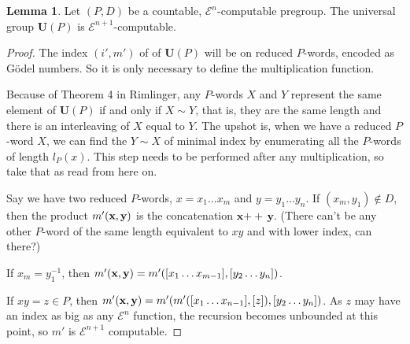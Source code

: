 \documentclass[a4paper]{article}
\newcommand{\grz}[1]{$\mathcal{E}^{#1}$}	%
\newcommand{\xvec}{\mathbf{x}}	%
\newcommand{\yvec}{\mathbf{y}}	%
\newcommand{\concat}{\ensuremath{+\!\!\!\!+\,}}	%
\newcommand{\ugroup}{\mathbf{U}(P)}														%
\theoremstyle{plain}
\theoremstyle{definition}
\newtheorem{lemma}[theorem]{Lemma}
\begin{document}
\begin{lemma} Let $(P,D)$ be a countable, \grz{n}-computable pregroup. The universal group $\ugroup$ is \grz{n+1}-computable.
\end{lemma}

\begin{proof}
The index $(i',m')$ of of $\ugroup$ will be on reduced $P$-words, encoded as G\"odel numbers. So it is only necessary to define the multiplication function.

Because of Theorem 4 in Rimlinger, any $P$-words $X$ and $Y$ represent the same element of $\ugroup$ if and only if $X \sim Y$, that is, they are the same length and there is an interleaving of $X$ equal to $Y$. The upshot is, when we have a reduced $P$-word $X$, we can find the $Y \sim X$ of minimal index by enumerating all the $P$-words of length $l_P(x)$. This step needs to be performed after any multiplication, so take that as read from here on.

Say we have two reduced $P$-words, $x = x_1 \dots x_m$ and $y = y_1 \dots y_n$. If $(x_m,y_1) \notin D$, then the product $m'({\bf x},{\bf y})$ is the concatenation $\xvec \concat \yvec$. (There can't be any other $P$-word of the same length equivalent to $xy$ and with lower index, can there?)

If $x_m = y_1^{-1}$, then $m'({\bf x},{\bf y}) = m'([x_1 \dots x_{m-1}],[y_2 \dots y_n])$.

If $xy = z \in P$, then $m'({\bf x},{\bf y}) = m'( m'([x_1 \dots x_{n-1}], [z]), [y_2 \dots y_n])$. As $z$ may have an index as big as any \grz{n} function, the recursion becomes unbounded at this point, so $m'$ is \grz{n+1} computable.
\end{proof}



\end{document}

